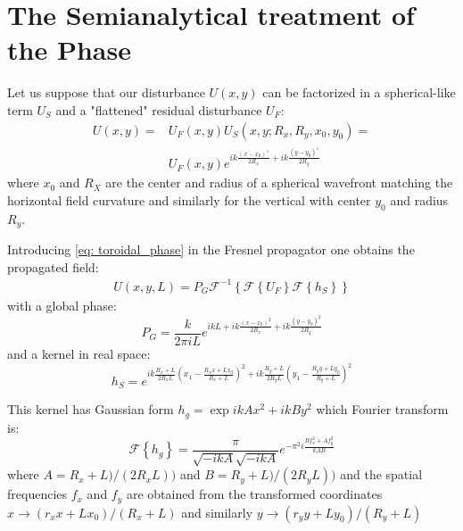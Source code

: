 \documentclass{iucr}              %
\begin{document}
\section{The Semianalytical treatment of the Phase}
\label{appendix: srw}
Let us suppose that our disturbance $U(x,y)$ can be factorized in a spherical-like term $U_S$ and a "flattened" residual disturbance $U_F$: 
\begin{equation}\label{eq: toroidal_phase}
	\begin{aligned}
	U(x, y) = & U_F(x,y) U_S(x,y;R_x,R_y,x_0,y_0) = \\
	          & U_F(x,y) e^{i k \frac{(x-x_0)^1}{2R_x}+i k \frac{(y-y_0)^1}{2R_y}}
\end{aligned}
\end{equation}
where $x_0$ and $R_X$ are the center and radius of a spherical wavefront matching the horizontal field curvature and similarly for the vertical with center $y_0$ and radius $R_y$. 

Introducing \ref{eq: toroidal_phase} in the Fresnel propagator one obtains the propagated field: 
\begin{equation}\label{eq: srw spherical phase}
	\begin{aligned}
	U(x, y, L) = P_G \mathcal{F}^{-1} \left\{  
	    \mathcal{F} \left\{ U_F \right\}
	    \mathcal{F} \left\{ h_S \right\}
	                                      \right\}
\end{aligned}
\end{equation}
with a global phase:
\begin{equation}\label{eq: srw global phase}
	P_G =  \frac{k}{2 \pi i L} e^{i k L + i k \frac{(x-x_0)^2}{2 R_x}+ i k \frac{(y-y_0)^2}{2 R_y}}
\end{equation}
and a kernel in real space: 
\begin{equation}\label{eq: srw global phase}
	h_S =  e^{
	  i k \frac{R_x+L}{2 R_x L} \left( x_1 - \frac{R_x x + L x_0}{R_x + L } \right) ^2 + 
	  i k \frac{R_y+L}{2 R_y L} \left( y_1 - \frac{R_y y + L y_0}{R_y + L } \right) ^2
	         }
\end{equation}

This kernel has Gaussian form $h_g = \exp{i k A x^2 + i k B y^2}$ which Fourier transform is: 
\begin{equation}
    \mathcal{F} \left\{ h_g \right\} = \frac{\pi}{\sqrt{-i k A}\sqrt{-i k A}} 
    e^{- \pi^2 i \frac{B f_x^2 + A f_y^2}{k A B}}
\end{equation}
where $A=R_x+L)/(2 R_x L))$ and $B=R_y+L)/(2 R_y L))$ and the spatial frequencies $f_x$ and $f_y$ are obtained from the transformed coordinates $x \rightarrow (r_x x + L x_0)/(R_x + L)$ and similarly $y \rightarrow (r_y y + L y_0)/(R_y + L)$
\end{document}
